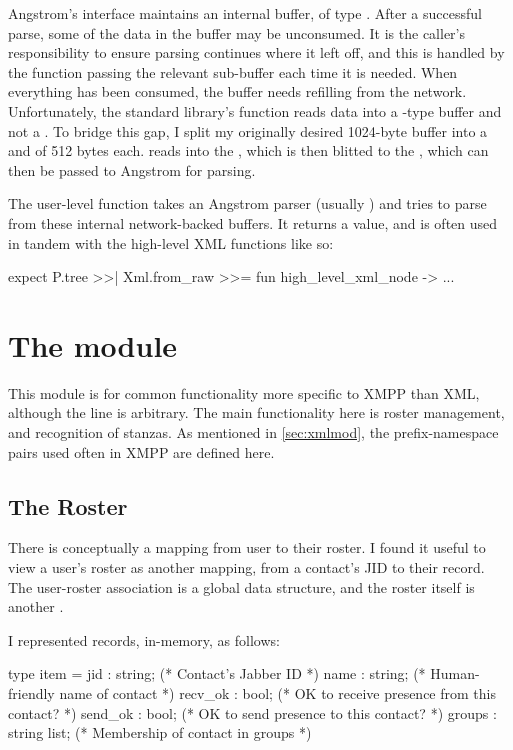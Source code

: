 \documentclass[12pt,a4paper,twoside,openright]{report}
\begin{document}
{Angstrom's  interface maintains an internal buffer, of type . After a successful parse, some of the data in the buffer may be unconsumed. It is the caller's responsibility to ensure parsing continues where it left off, and this is handled by the function passing the relevant sub-buffer each time it is needed. When everything has been consumed, the buffer needs refilling from the network. Unfortunately, the standard library's  function reads data into a -type buffer and not a . To bridge this gap, I split my originally desired 1024-byte buffer into a  and  of 512 bytes each.  reads into the , which is then blitted to the , which can then be passed to Angstrom for parsing.

The user-level  function takes an Angstrom parser (usually ) and tries to parse from these internal network-backed buffers. It returns a  value, and is often used in tandem with the high-level XML functions like so:

\begin{ocaml}
expect P.tree >>| Xml.from_raw >>= fun high_level_xml_node -> ...
\end{ocaml}

\section{The  module}
This module is for common functionality more specific to XMPP than XML, although the line is arbitrary. The main functionality here is roster management, and recognition of stanzas. As mentioned in \ref{sec:xmlmod}, the prefix-namespace pairs used often in XMPP are defined here.

\subsection{The Roster}
There is conceptually a mapping from user to their roster. I found it useful to view a user's roster as another mapping, from a contact's JID to their  record. The user-roster association is a global  data structure, and the roster itself is another .

I represented  records, in-memory, as follows:

\begin{minipage}{\linewidth}
  \begin{ocaml}
    type item = {
      jid     : string;        (* Contact's Jabber ID                       *)
      name    : string;        (* Human-friendly name of contact            *)
      recv_ok : bool;          (* OK to receive presence from this contact? *)
      send_ok : bool;          (* OK to send presence to this contact?      *)
      groups  : string list; (* Membership of contact in groups           *)
    }
  \end{ocaml}
\end{minipage}

}
\end{document}
